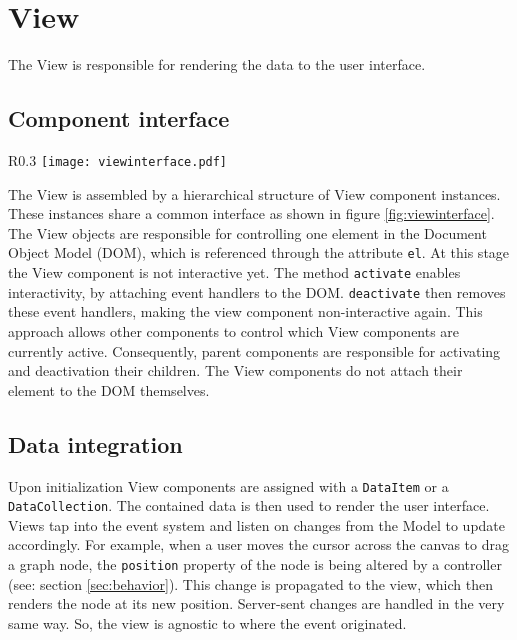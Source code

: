 \section{View}

The View is responsible for rendering the data to the user interface.

\subsection{Component interface}

\begin{wrapfigure}{R}{0.3\textwidth}
\texttt{[image: viewinterface.pdf]}
\caption{Class diagram of the View component interface}
\label{fig:viewinterface}
\end{wrapfigure}

The View is assembled by a hierarchical structure of View component instances. These instances share a common interface as shown in figure \ref{fig:viewinterface}. The View objects are responsible for controlling one element in the Document Object Model (DOM), which is referenced through the attribute \texttt{el}. At this stage the View component is not interactive yet. The method \texttt{activate} enables interactivity, by attaching event handlers to the DOM. \texttt{deactivate} then removes these event handlers, making the view component non-interactive again. This approach allows other components to control which View components are currently active. Consequently, parent components are responsible for activating and deactivation their children. The View components do not attach their element to the DOM themselves.

\subsection{Data integration}

Upon initialization View components are assigned with a \texttt{DataItem} or a \texttt{DataCollection}. The contained data is then used to render the user interface. Views tap into the event system and listen on changes from the Model to update accordingly. For example, when a user moves the cursor across the canvas to drag a graph node, the \texttt{position} property of the node is being altered by a controller (see: section \ref{sec:behavior}). This change is propagated to the view, which then renders the node at its new position. Server-sent changes are handled in the very same way. So, the view is agnostic to where the event originated.

